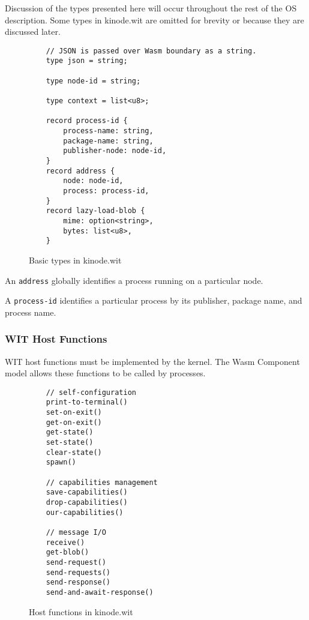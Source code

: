 \documentclass[runningheads]{llncs}
\begin{document}
Discussion of the types presented here will occur throughout the rest of the OS description.
Some types in kinode.wit are omitted for brevity or because they are discussed later.

\begin{figure}[H]
    \centering
    \begin{verbatim}
    // JSON is passed over Wasm boundary as a string.
    type json = string;

    type node-id = string;

    type context = list<u8>;

    record process-id {
        process-name: string,
        package-name: string,
        publisher-node: node-id,
    }
    record address {
        node: node-id,
        process: process-id,
    }
    record lazy-load-blob {
        mime: option<string>,
        bytes: list<u8>,
    }
    \end{verbatim}
    \caption{Basic types in kinode.wit}
    \label{fig:WIT Types 1}
\end{figure}

An \verb|address| globally identifies a process running on a particular node.

A \verb|process-id| identifies a particular process by its publisher, package name, and process name.

\subsubsection{WIT Host Functions}
\label{sec:oswitfuncs}

WIT host functions must be implemented by the kernel.
The Wasm Component model allows these functions to be called by processes.

\begin{figure}[H]
    \centering
    \begin{verbatim}
    // self-configuration
    print-to-terminal()
    set-on-exit()
    get-on-exit()
    get-state()
    set-state()
    clear-state()
    spawn()

    // capabilities management
    save-capabilities()
    drop-capabilities()
    our-capabilities()

    // message I/O
    receive()
    get-blob()
    send-request()
    send-requests()
    send-response()
    send-and-await-response()
    \end{verbatim}
    \caption{Host functions in kinode.wit}
    \label{fig:WIT Functions}
\end{figure}
\end{document}
